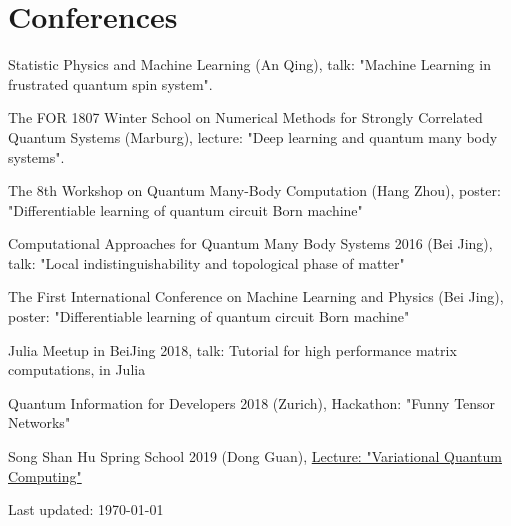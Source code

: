 \documentclass[letterpaper]{article}
\def\footerlink{}   %
\renewenvironment{itemize}{
  \begin{list}{}{
    \setlength{\leftmargin}{1.5em}
  }
}{
  \end{list}
}
\begin{document}
\section*{Conferences}
\begin{itemize}
    \item [1] Statistic Physics and Machine Learning (An Qing), talk: "Machine Learning in frustrated quantum spin system".
    \item [2] The FOR 1807 Winter School on Numerical Methods for Strongly Correlated Quantum Systems (Marburg), lecture: "Deep learning and quantum many body systems".
    \item [3] The 8th Workshop on Quantum Many-Body Computation (Hang Zhou), poster: "Differentiable learning of quantum circuit Born machine"
    \item [4] Computational Approaches for Quantum Many Body Systems 2016 (Bei Jing), talk: "Local indistinguishability and topological phase of matter"
    \item [5] The First International Conference on Machine Learning and Physics (Bei Jing), poster: "Differentiable learning of quantum circuit Born machine"
    \item [6] Julia Meetup in BeiJing 2018, talk: Tutorial for high performance matrix computations, in Julia
    \item [7] Quantum Information for Developers 2018 (Zurich), Hackathon: "Funny Tensor Networks"
    \item [8] Song Shan Hu Spring School 2019 (Dong Guan), \href{https://github.com/QuantumBFS/SSSS}{Lecture: "Variational Quantum Computing"}
\end{itemize}

\bigskip

\begin{center}
  \begin{footnotesize}
    Last updated: \today \\
    \href{\footerlink}{\texttt{\footerlink}}
  \end{footnotesize}
\end{center}
\end{document}
